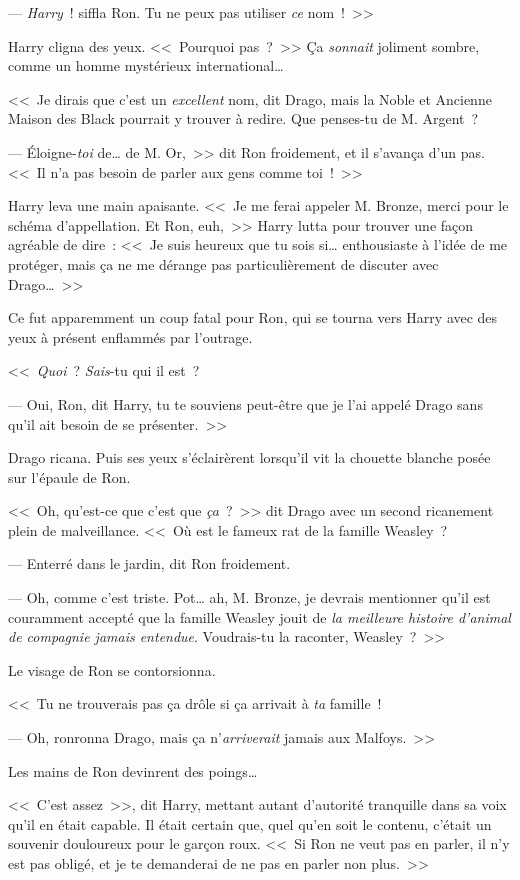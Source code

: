 --- \emph{Harry}~! siffla Ron. Tu ne peux pas utiliser \emph{ce} nom~!~>>

Harry cligna des yeux. <<~Pourquoi pas~?~>> Ça \emph{sonnait} joliment sombre, comme un homme mystérieux international…

<<~Je dirais que c'est un \emph{excellent} nom, dit Drago, mais la Noble et Ancienne Maison des Black pourrait y trouver à redire. Que penses-tu de M. Argent~?

--- Éloigne-\emph{toi} de… de M. Or,~>> dit Ron froidement, et il s'avança d'un pas. <<~Il n'a pas besoin de parler aux gens comme toi~!~>>

Harry leva une main apaisante. <<~Je me ferai appeler M. Bronze, merci pour le schéma d'appellation. Et Ron, euh,~>> Harry lutta pour trouver une façon agréable de dire~: <<~Je suis heureux que tu sois si… enthousiaste à l'idée de me protéger, mais ça ne me dérange pas particulièrement de discuter avec Drago…~>>

Ce fut apparemment un coup fatal pour Ron, qui se tourna vers Harry avec des yeux à présent enflammés par l'outrage.

<<~\emph{Quoi}~? \emph{Sais}-tu qui il est~?

--- Oui, Ron, dit Harry, tu te souviens peut-être que je l'ai appelé Drago sans qu'il ait besoin de se présenter.~>>

Drago ricana. Puis ses yeux s'éclairèrent lorsqu'il vit la chouette blanche posée sur l'épaule de Ron.

<<~Oh, qu'est-ce que c'est que \emph{ça}~?~>> dit Drago avec un second ricanement plein de malveillance. <<~Où est le fameux rat de la famille Weasley~?

--- Enterré dans le jardin, dit Ron froidement.

--- Oh, comme c'est triste. Pot… ah, M. Bronze, je devrais mentionner qu'il est couramment accepté que la famille Weasley jouit de \emph{la meilleure histoire d'animal de compagnie jamais entendue}. Voudrais-tu la raconter, Weasley~?~>>

Le visage de Ron se contorsionna.

<<~Tu ne trouverais pas ça drôle si ça arrivait à \emph{ta} famille~!

--- Oh, ronronna Drago, mais ça n'\emph{arriverait} jamais aux Malfoys.~>>

Les mains de Ron devinrent des poings…

<<~C'est assez~>>, dit Harry, mettant autant d'autorité tranquille dans sa voix qu'il en était capable. Il était certain que, quel qu'en soit le contenu, c'était un souvenir douloureux pour le garçon roux. <<~Si Ron ne veut pas en parler, il n'y est pas obligé, et je te demanderai de ne pas en parler non plus.~>>

